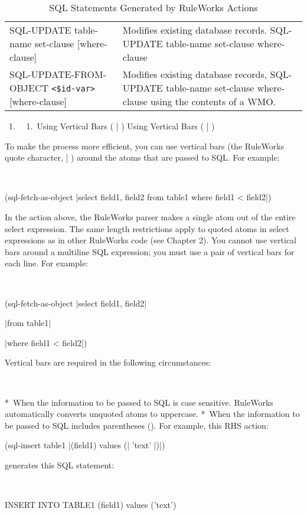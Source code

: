 \begin{table}
\begin{tabularx}{\columnwidth}{XX}
     SQL-UPDATE table-name set-clause 
     [where-clause] & Modifies existing database
     records.
     SQL-UPDATE table-name set-clause where-clause \\

     SQL-UPDATE-FROM-OBJECT \verb|<$id-var>|
     [where-clause] & Modifies existing database
     records,
     SQL-UPDATE table-name set-clause where-clause
      using the contents of a WMO. \\
    \bottomrule
  \end{tabularx}
  \caption{SQL Statements Generated by RuleWorks Actions}
\end{table}


       1. 
       1. Using Vertical Bars ( | ) Using Vertical
          Bars ( | )

To make the process more efficient, you can use
vertical bars (the RuleWorks quote character, | )
around the atoms that are passed to SQL. For
example:

 

        (sql-fetch-as-object |select field1, field2
        from table1 where field1 < field2|)

In the action above, the RuleWorks parser makes a
single atom out of the entire select expression.
The same length restrictions apply to quoted atoms
in select expressions as in other RuleWorks code
(see Chapter 2). You cannot use vertical bars
around a multiline SQL expression; you must use a
pair of vertical bars for each line. For example:

 

        (sql-fetch-as-object |select field1,
        field2|

        |from table1|

        |where field1 < field2|)

Vertical bars are required in the following
circumstances:

 

  * When the information to be passed to SQL is
    case sensitive. RuleWorks automatically
    converts unquoted atoms to uppercase.
  * When the information to be passed to SQL
    includes parentheses (). For example, this RHS
    action:

        (sql-insert table1 |(field1) values (|
        'text' |)|)

generates this SQL statement:

 

        INSERT INTO TABLE1 (field1) values ('text')

